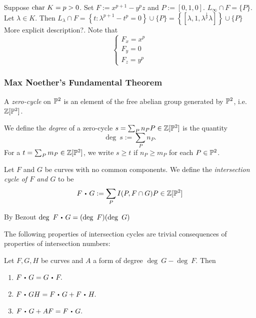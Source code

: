     \begin{example}
        Suppose $\mathrm{char} \ K = p >0$. Set $F:=x^{p+1}-y^pz$ and $P:= [0,1,0]$. $L_\infty \cap F = \{P\}$. Let $\lambda \in K$. Then $L_\lambda \cap F= \left\{t : \lambda^{p+1} -t^{p}=0\right\}\cup \{P\} =\left\{ \left[\lambda , 1, \lambda^{\frac{1}{p}}{\lambda}\right]\right\}\cup \{P\}$ {\Large More explicit description?}. Note that 
        $$\begin{cases}
            F_x = x^p\\
            F_y = 0\\
            F_z = y^p
        \end{cases}$$
    \end{example}
\subsubsection{Max Noether's Fundamental Theorem}
    \begin{definition}
        A \textit{zero-cycle} on $\mathbb{P}^2$ is an element of the free abelian group generated by $\mathbb{P}^2$, i.e. $\mathbb{Z}[\mathbb{P}^2]$.
    \end{definition}
    \begin{definition}
        We define the \textit{degree} of a zero-cycle $s=\sum_P n_PP\in \mathbb{Z}[\mathbb{P}^2]$ is the quantity
        $$\deg \ s := \sum_P n_P.$$
        For a $t= \sum_P m_P\in \mathbb{Z}[\mathbb{P}^2]$, we write $s\geq t$ if $n_P\geq m_P$ for each $P\in \mathbb{P}^2$.
    \end{definition}
    \begin{definition}
        Let $F$ and $G$ be curves with no common components. We define the \textit{intersection cycle of $F$ and $G$} to be 
        $$F\ic G:= \sum_P I(P,F\cap G)P\in\Z[\Pp^2]$$
    \end{definition}
    \begin{remark}
        By Bezout $\deg \ F\ic G = (\deg\ F)(\deg \ G)$
    \end{remark}
    The following properties of intersection cycles are trivial consequences of properties of intersection numbers:
    \begin{lemma}
        Let $F,G,H$ be curves and $A$ a form of degree $\deg \ G - \deg \ F$. Then 
        \begin{enumerate}
            \item $F\ic G = G\ic F.$
            \item $F\ic GH = F\ic G + F\ic H.$
            \item $F\ic G + AF = F \ic G.$
        \end{enumerate}
    \end{lemma}
